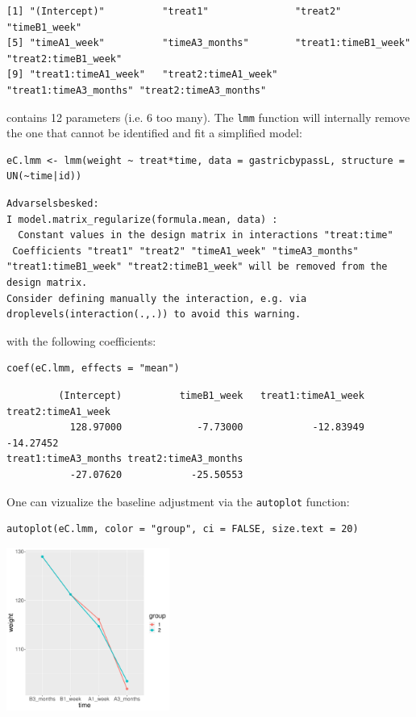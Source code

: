 \documentclass[12pt]{article}
\begin{document}
\begin{verbatim}
[1] "(Intercept)"          "treat1"               "treat2"               "timeB1_week"         
[5] "timeA1_week"          "timeA3_months"        "treat1:timeB1_week"   "treat2:timeB1_week"  
[9] "treat1:timeA1_week"   "treat2:timeA1_week"   "treat1:timeA3_months" "treat2:timeA3_months"
\end{verbatim}


contains 12 parameters (i.e. 6 too many). The \texttt{lmm} function will
internally remove the one that cannot be identified and fit a
simplified model:
\lstset{language=r,label= ,caption= ,captionpos=b,numbers=none}
\begin{lstlisting}
eC.lmm <- lmm(weight ~ treat*time, data = gastricbypassL, structure = UN(~time|id))
\end{lstlisting}

\begin{verbatim}
Advarselsbesked:
I model.matrix_regularize(formula.mean, data) :
  Constant values in the design matrix in interactions "treat:time"
 Coefficients "treat1" "treat2" "timeA1_week" "timeA3_months" "treat1:timeB1_week" "treat2:timeB1_week" will be removed from the design matrix. 
Consider defining manually the interaction, e.g. via droplevels(interaction(.,.)) to avoid this warning.
\end{verbatim}


with the following coefficients:
\lstset{language=r,label= ,caption= ,captionpos=b,numbers=none}
\begin{lstlisting}
coef(eC.lmm, effects = "mean")
\end{lstlisting}

\begin{verbatim}
         (Intercept)          timeB1_week   treat1:timeA1_week   treat2:timeA1_week 
           128.97000             -7.73000            -12.83949            -14.27452 
treat1:timeA3_months treat2:timeA3_months 
           -27.07620            -25.50553
\end{verbatim}


One can vizualize the baseline adjustment via the \texttt{autoplot} function:
\lstset{language=r,label= ,caption= ,captionpos=b,numbers=none}
\begin{lstlisting}
autoplot(eC.lmm, color = "group", ci = FALSE, size.text = 20)
\end{lstlisting}

\begin{center}
\includegraphics[width=0.4\textwidth]{./figures/gg-baseAdj.pdf}
\end{center}
\end{document}
